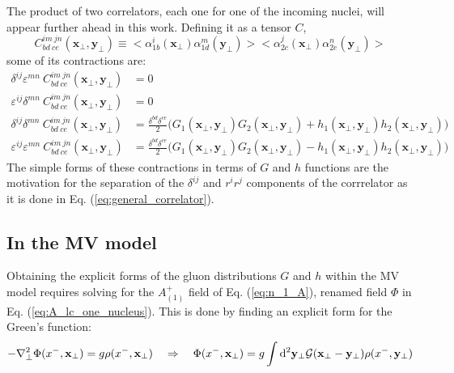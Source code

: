 The product of two correlators, each one for one of the incoming nuclei, will appear further ahead in this work. Defining it as a tensor $C$,
\begin{equation}
 C^{im~jn}_{bd~ce} (\mathbf{x}_\perp,\mathbf{y}_\perp) \equiv \big< \alpha^i_{1b} (\mathbf{x}_\perp) \alpha^m_{1d} (\mathbf{y}_\perp) \big>
 \big< \alpha^j_{2c} (\mathbf{x}_\perp) \alpha^n_{2e} (\mathbf{y}_\perp) \big>
\end{equation}
some of its contractions are:
\begin{subequations}
\begin{align}
\delta^{ij} \varepsilon^{mn} ~
C^{im~jn}_{bd~ce} (\mathbf{x}_\perp,\mathbf{y}_\perp) & = 0 \label{eq:correlator_contractions_null1}\\
\varepsilon^{ij} \delta^{mn} ~
C^{im~jn}_{bd~ce} (\mathbf{x}_\perp,\mathbf{y}_\perp) & = 0 \label{eq:correlator_contractions_null2}\\
\delta^{ij} \delta^{mn} ~
C^{im~jn}_{bd~ce} (\mathbf{x}_\perp,\mathbf{y}_\perp) & = \frac{\delta^{bd}\delta^{ce}}{2} \big( G_1(\mathbf{x}_\perp,\mathbf{y}_\perp) G_2(\mathbf{x}_\perp,\mathbf{y}_\perp) + h_1(\mathbf{x}_\perp,\mathbf{y}_\perp) h_2(\mathbf{x}_\perp,\mathbf{y}_\perp)\big)\\
\varepsilon^{ij} \varepsilon^{mn} ~
C^{im~jn}_{bd~ce} (\mathbf{x}_\perp,\mathbf{y}_\perp) & = \frac{\delta^{bd}\delta^{ce}}{2} \big( G_1(\mathbf{x}_\perp,\mathbf{y}_\perp) G_2(\mathbf{x}_\perp,\mathbf{y}_\perp) - h_1(\mathbf{x}_\perp,\mathbf{y}_\perp) h_2(\mathbf{x}_\perp,\mathbf{y}_\perp)\big)
\end{align}
\label{eq:correlator_contractions}
\end{subequations}
The simple forms of these contractions in terms of $G$ and $h$ functions are the motivation for the separation of the $\delta^{ij}$ and $r^i r^j$ components of the corrrelator as it is done in Eq. (\ref{eq:general_correlator}).

\subsection{In the MV model}

Obtaining the explicit forms of the gluon distributions $G$ and $h$ within the \gls{MV} model requires solving for the $A^+_{(1)}$ field of Eq. (\ref{eq:n_1_A}), renamed field $\Phi$ in Eq. (\ref{eq:A_lc_one_nucleus}). This is done by finding an explicit form for the Green's function:
\begin{equation}
	- \nabla^2_\perp \Phi(x^-, \mathbf{x}_\perp) = g \rho (x^-,\mathbf{x}_\perp) \quad \Rightarrow \quad 
	\Phi(x^-,\mathbf{x}_\perp) = g  \int \mathop{}\!\mathrm{d}^2 \mathbf{y}_\perp \mathcal{G}(\mathbf{x_\perp} - \mathbf{y_\perp}) \rho(x^-,\mathbf{y}_\perp)
\end{equation}


